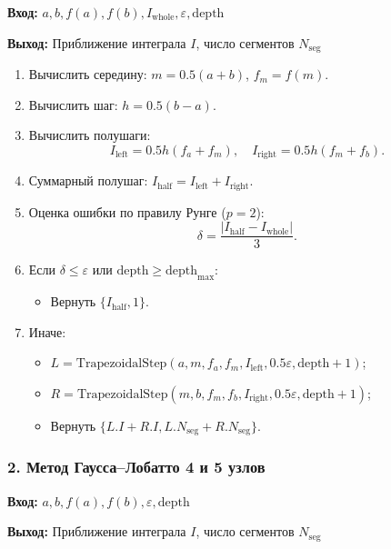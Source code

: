 \documentclass[14pt]{extarticle}
\begin{document}
	\textbf{Вход:} $a, b, f(a), f(b), I_{\text{whole}}, \varepsilon, \text{depth}$
	
	\textbf{Выход:} Приближение интеграла $I$, число сегментов $N_{\text{seg}}$
	
	\begin{enumerate}[noitemsep]
		\item Вычислить середину: $m = 0.5(a + b)$, $f_m = f(m)$.
		\item Вычислить шаг: $h = 0.5(b - a)$.
		\item Вычислить полушаги:
		\[
		I_{\text{left}} = 0.5 h (f_a + f_m), \quad I_{\text{right}} = 0.5 h (f_m + f_b).
		\]
		\item Суммарный полушаг: $I_{\text{half}} = I_{\text{left}} + I_{\text{right}}$.
		\item Оценка ошибки по правилу Рунге ($p = 2$):
		\[
		\delta = \frac{|I_{\text{half}} - I_{\text{whole}}|}{3}.
		\]
		\item Если $\delta \le \varepsilon$ или $\text{depth} \ge \text{depth}_{\max}$:
		\begin{itemize}[noitemsep]
			\item Вернуть $\{I_{\text{half}}, 1\}$.
		\end{itemize}
		\item Иначе:
		\begin{itemize}[noitemsep]
			\item $L = \text{TrapezoidalStep}(a, m, f_a, f_m, I_{\text{left}}, 0.5\varepsilon, \text{depth} + 1)$;
			\item $R = \text{TrapezoidalStep}(m, b, f_m, f_b, I_{\text{right}}, 0.5\varepsilon, \text{depth} + 1)$;
			\item Вернуть $\{L.I + R.I, L.N_{\text{seg}} + R.N_{\text{seg}}\}$.
		\end{itemize}
	\end{enumerate}
	
	\subsubsection{2. Метод Гаусса–Лобатто 4 и 5 узлов}
	
	\textbf{Вход:} $a, b, f(a), f(b), \varepsilon, \text{depth}$
	
	\textbf{Выход:} Приближение интеграла $I$, число сегментов $N_{\text{seg}}$
	
\end{document}
